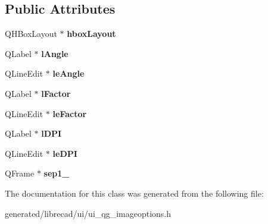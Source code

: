 \subsection*{Public Attributes}
\begin{DoxyCompactItemize}
\item 
\hypertarget{classUi__QG__ImageOptions_ac223fb92b0e478bbd365b7db0e9d8ab6}{Q\-H\-Box\-Layout $\ast$ {\bfseries hbox\-Layout}}\label{classUi__QG__ImageOptions_ac223fb92b0e478bbd365b7db0e9d8ab6}

\item 
\hypertarget{classUi__QG__ImageOptions_aeafdce012aa0e00ce8b268658116dbc8}{Q\-Label $\ast$ {\bfseries l\-Angle}}\label{classUi__QG__ImageOptions_aeafdce012aa0e00ce8b268658116dbc8}

\item 
\hypertarget{classUi__QG__ImageOptions_abcc24e18b355d89361e05fc79911c150}{Q\-Line\-Edit $\ast$ {\bfseries le\-Angle}}\label{classUi__QG__ImageOptions_abcc24e18b355d89361e05fc79911c150}

\item 
\hypertarget{classUi__QG__ImageOptions_a640a74f29a4d6ea158fbacb1b8147212}{Q\-Label $\ast$ {\bfseries l\-Factor}}\label{classUi__QG__ImageOptions_a640a74f29a4d6ea158fbacb1b8147212}

\item 
\hypertarget{classUi__QG__ImageOptions_a9950ec99da96a2921dcbc5c1b1f91842}{Q\-Line\-Edit $\ast$ {\bfseries le\-Factor}}\label{classUi__QG__ImageOptions_a9950ec99da96a2921dcbc5c1b1f91842}

\item 
\hypertarget{classUi__QG__ImageOptions_aea47f1af8f45db200799f0571936e404}{Q\-Label $\ast$ {\bfseries l\-D\-P\-I}}\label{classUi__QG__ImageOptions_aea47f1af8f45db200799f0571936e404}

\item 
\hypertarget{classUi__QG__ImageOptions_af13143391d34b3f17356d8b45a39189c}{Q\-Line\-Edit $\ast$ {\bfseries le\-D\-P\-I}}\label{classUi__QG__ImageOptions_af13143391d34b3f17356d8b45a39189c}

\item 
\hypertarget{classUi__QG__ImageOptions_a733538dd7bf2f040e233fde8b8d26862}{Q\-Frame $\ast$ {\bfseries sep1\-\_}}\label{classUi__QG__ImageOptions_a733538dd7bf2f040e233fde8b8d26862}

\end{DoxyCompactItemize}


The documentation for this class was generated from the following file\-:\begin{DoxyCompactItemize}
\item 
generated/librecad/ui/ui\-\_\-qg\-\_\-imageoptions.\-h\end{DoxyCompactItemize}
